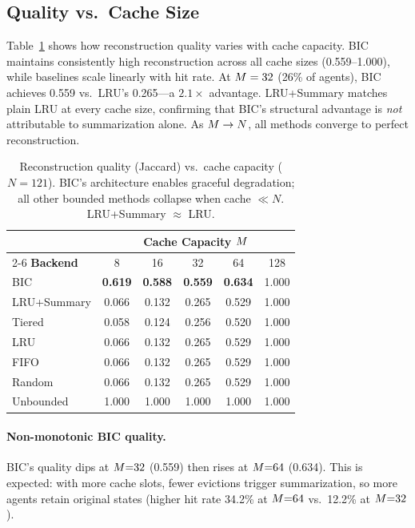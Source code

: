 \subsection{Quality vs.\ Cache Size}
\label{sec:quality-vs-cache}

Table~\ref{tab:quality-cache} shows how reconstruction quality varies
with cache capacity.  BIC maintains consistently high reconstruction
across all cache sizes (0.559--1.000), while baselines scale linearly
with hit rate.  At $M = 32$ (26\% of agents), BIC achieves
0.559 vs.\ LRU's 0.265---a $2.1\times$ advantage.  LRU+Summary
matches plain LRU at every cache size, confirming that BIC's
structural advantage is \emph{not} attributable to summarization
alone.  As $M \to N$, all methods converge to perfect
reconstruction.

\begin{table}[t]
\centering
\caption{Reconstruction quality (Jaccard) vs.\ cache capacity ($N{=}121$).
  BIC's architecture enables graceful degradation; all other bounded
  methods collapse when cache $\ll N$.  LRU+Summary $\approx$ LRU.}
\label{tab:quality-cache}
\vspace{0.3em}
\begin{tabular}{lccccc}
\toprule
& \multicolumn{5}{c}{\textbf{Cache Capacity} $M$} \\
\cmidrule(l){2-6}
\textbf{Backend} & 8 & 16 & 32 & 64 & 128 \\
\midrule
BIC        & \textbf{0.619} & \textbf{0.588} & \textbf{0.559} & \textbf{0.634} & 1.000 \\
LRU+Summary & 0.066 & 0.132 & 0.265 & 0.529 & 1.000 \\
Tiered     & 0.058 & 0.124 & 0.256 & 0.520 & 1.000 \\
LRU        & 0.066 & 0.132 & 0.265 & 0.529 & 1.000 \\
FIFO       & 0.066 & 0.132 & 0.265 & 0.529 & 1.000 \\
Random     & 0.066 & 0.132 & 0.265 & 0.529 & 1.000 \\
Unbounded  & 1.000 & 1.000 & 1.000 & 1.000 & 1.000 \\
\bottomrule
\end{tabular}
\end{table}

\paragraph{Non-monotonic BIC quality.}
BIC's quality dips at $M{=}32$ (0.559) then rises at
$M{=}64$ (0.634). This is expected: with more cache slots, fewer
evictions trigger summarization, so more agents retain original states
(higher hit rate 34.2\% at $M{=}64$ vs.\ 12.2\% at $M{=}32$).

